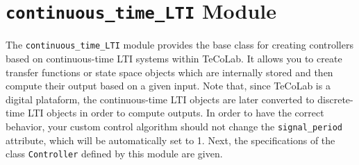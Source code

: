\documentclass[12pt]{report}
\begin{document}
\section{\texttt{continuous\_time\_LTI} Module}

The \texttt{continuous\_time\_LTI} module provides the base class for creating controllers based on continuous-time LTI systems within TeCoLab. It allows you to create transfer functions or state space objects which are internally stored and then compute their output based on a given input. Note that, since TeCoLab is a digital plataform, the continuous-time LTI objects are later converted to discrete-time LTI objects in order to compute outputs. In order to have the correct behavior, your custom control algorithm should not change the \texttt{signal\_period} attribute, which will be automatically set to 1. Next, the specifications of the class \texttt{Controller} defined by this module are given.
\end{document}
